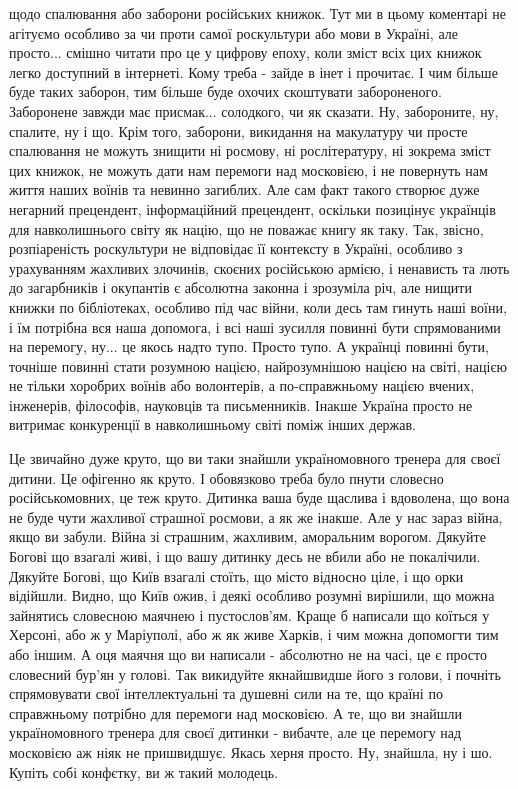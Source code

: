 щодо спалювання або заборони російських книжок. Тут ми в цьому коментарі не
агітуємо особливо за чи проти самої роскультури або мови в Україні, але
просто... смішно читати про це у цифрову епоху, коли зміст всіх цих книжок
легко доступний в інтернеті. Кому треба - зайде в інет і прочитає. І чим більше
буде таких заборон, тим більше буде охочих скоштувати забороненого. Заборонене
завжди має присмак... солодкого, чи як сказати. Ну, забороните, ну, спалите, ну
і що. Крім того, заборони, викидання на макулатуру чи просте спалювання не
можуть знищити ні росмову, ні рослітературу, ні зокрема зміст цих книжок, не
можуть дати нам перемоги над московією, і не повернуть нам життя наших воїнів
та невинно загиблих. Але сам факт такого створює дуже негарний прецендент,
інформаційний прецендент, оскільки позицінує українців для навколишнього світу
як націю, що не поважає книгу як таку.  Так, звісно, розпіареність роскультури
не відповідає її контексту в Україні, особливо з урахуванням жахливих злочинів,
скоєних російською армією, і ненависть та лють до загарбників і окупантів є
абсолютна законна і зрозуміла річ, але нищити книжки по бібліотеках, особливо
під час війни, коли десь там гинуть наші воїни, і їм потрібна вся наша
допомога, і всі наші зусилля повинні бути спрямованими на перемогу, ну... це
якось  надто тупо. Просто тупо. А українці повинні бути, точніше повинні стати
розумною нацією, найрозумнішою нацією на світі, нацією не тільки хоробрих
воїнів або волонтерів, а по-справжньому нацією вчених, інженерів, філософів,
науковців та письменників. Інакше Україна просто не витримає конкуренції в
навколишньому світі поміж інших держав.  

Це звичайно дуже круто, що ви таки знайшли україномовного тренера для своєї
дитини. Це офігенно як круто. І обовязково треба було пнути словесно
російськомовних, це теж круто. Дитинка ваша буде щаслива і вдоволена, що вона
не буде чути жахливої страшної росмови, а як же інакше. Але у нас зараз війна,
якщо ви забули. Війна зі страшним, жахливим, аморальним ворогом. Дякуйте Богові
що взагалі живі, і що вашу дитинку десь не вбили або не покалічили. Дякуйте
Богові, що Київ взагалі стоїть, що місто відносно ціле, і що орки відійшли.
Видно, що Київ ожив, і деякі особливо розумні вирішили, що можна зайнятись
словесною маячнею і пустослов'ям. Краще б написали що коїться у Херсоні, або ж
у Маріуполі, або ж як живе Харків, і чим можна допомогти тим або іншим. А оця
маячня що ви написали - абсолютно не на часі, це є просто словесний бур'ян у
голові. Так викидуйте якнайшвидше його з голови, і почніть спрямовувати свої
інтеллектуальні та душевні сили на те, що країні по справжньому потрібно для
перемоги над московією. А те, що ви знайшли україномовного тренера для своєї
дитинки - вибачте, але це перемогу над московією аж ніяк не пришвидшує. Якась
херня просто. Ну, знайшла, ну і шо. Купіть собі конфєтку, ви ж такий молодець.

